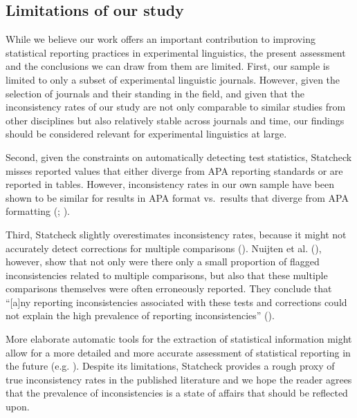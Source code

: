 \documentclass[
  doc,
  longtable,
  nolmodern,
  notxfonts,
  notimes,
  colorlinks=true,linkcolor=blue,citecolor=blue,urlcolor=blue]{apa7}
\begin{document}
\subsection{Limitations of our study}\label{limitations-of-our-study}

While we believe our work offers an important contribution to improving
statistical reporting practices in experimental linguistics, the present
assessment and the conclusions we can draw from them are limited. First,
our sample is limited to only a subset of experimental linguistic
journals. However, given the selection of journals and their standing in
the field, and given that the inconsistency rates of our study are not
only comparable to similar studies from other disciplines but also
relatively stable across journals and time, our findings should be
considered relevant for experimental linguistics at large.

Second, given the constraints on automatically detecting test
statistics, Statcheck misses reported values that either diverge from
APA reporting standards or are reported in tables. However,
inconsistency rates in our own sample have been shown to be similar for
results in APA format vs.~results that diverge from APA formatting
(;
).

Third, Statcheck slightly overestimates inconsistency rates, because it
might not accurately detect corrections for multiple comparisons
(). Nuijten et al.
(), however, show that not only
were there only a small proportion of flagged inconsistencies related to
multiple comparisons, but also that these multiple comparisons
themselves were often erroneously reported. They conclude that
``{[}a{]}ny reporting inconsistencies associated with these tests and
corrections could not explain the high prevalence of reporting
inconsistencies'' ().

More elaborate automatic tools for the extraction of statistical
information might allow for a more detailed and more accurate assessment
of statistical reporting in the future (e.g.
). Despite its
limitations, Statcheck provides a rough proxy of true inconsistency
rates in the published literature and we hope the reader agrees that the
prevalence of inconsistencies is a state of affairs that should be
reflected upon.
\end{document}
